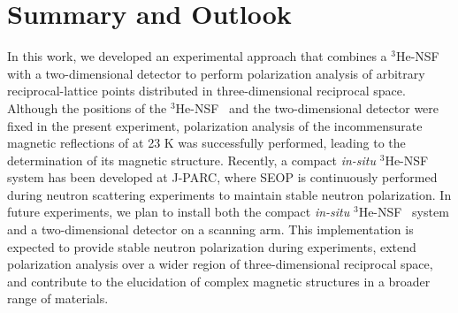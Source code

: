 \documentclass[%
 reprint,
superscriptaddress,
 amsmath,amssymb,
 aps,
]{revtex4-2}
\newcommand{\Hensf}{$^3$He-NSF}
\begin{document}

\section{Summary and Outlook}
In this work, we developed an experimental approach that combines a \Hensf~ with a two-dimensional detector to perform polarization analysis of arbitrary reciprocal-lattice points distributed in three-dimensional reciprocal space.
Although the positions of the \Hensf~ and the two-dimensional detector were fixed in the present experiment, polarization analysis of the incommensurate magnetic reflections of  at 23 K was successfully performed, leading to the determination of its magnetic structure.
Recently, a compact \textit{in-situ} \Hensf~ system has been developed at J-PARC, where SEOP is continuously performed during neutron scattering experiments to maintain stable neutron polarization.
In future experiments, we plan to install both the compact \textit{in-situ} \Hensf~ system and a two-dimensional detector on a scanning arm.
This implementation is expected to provide stable neutron polarization during experiments, extend polarization analysis over a wider region of three-dimensional reciprocal space, and contribute to the elucidation of complex magnetic structures in a broader range of materials.
\begin{acknowledgments}
\end{acknowledgments}

\appendix
\end{document}
